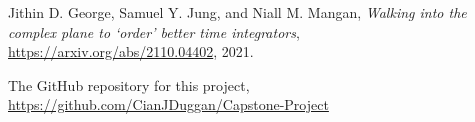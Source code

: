 \providecommand{\bysame}{\leavevmode\hbox to3em{\hrulefill}\thinspace}
\providecommand{\href}[2]{#2}
\begin{thebibliography}{1}

Jithin D. George, Samuel Y. Jung, and Niall M. Mangan, \emph{{W}alking into the complex plane to `order' better time integrators}, \url{https://arxiv.org/abs/2110.04402}, 2021.

The GitHub repository for this project, \url{https://github.com/CianJDuggan/Capstone-Project}

\end{thebibliography}
